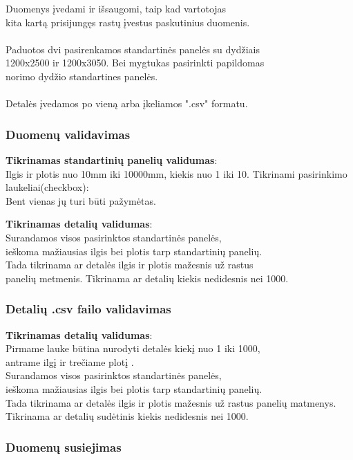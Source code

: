 \documentclass[a4paper,12pt]{article}
\begin{document}
Duomenys įvedami ir išsaugomi, taip kad vartotojas \\
kita kartą prisijungęs rastų įvestus paskutinius duomenis.\\\\
Paduotos dvi pasirenkamos standartinės panelės su dydžiais \\
1200x2500 ir 1200x3050. Bei mygtukas pasirinkti papildomas\\
norimo dydžio standartines panelės. \\\\
Detalės įvedamos po vieną arba įkeliamos ".csv" formatu. 

\subsubsection{Duomenų validavimas}
\textbf{Tikrinamas standartinių panelių validumas}:\\
	Ilgis ir plotis nuo 10mm iki 10000mm, kiekis nuo 1 iki 10.
Tikrinami pasirinkimo laukeliai(checkbox): \\
Bent vienas jų turi būti pažymėtas.

\textbf{Tikrinamas detalių validumas}:\\
Surandamos visos pasirinktos standartinės panelės, \\
ieškoma mažiausias ilgis bei plotis tarp standartinių panelių.\\
Tada tikrinama ar detalės ilgis ir plotis mažesnis už rastus \\
panelių metmenis.
Tikrinama ar detalių kiekis nedidesnis nei 1000.

\subsubsection{Detalių .csv failo validavimas}
\textbf{Tikrinamas detalių validumas}:\\
Pirmame lauke būtina nurodyti detalės kiekį nuo 1 iki 1000, \\
antrame ilgį ir trečiame plotį .\\

Surandamos visos pasirinktos standartinės panelės, \\
ieškoma mažiausias ilgis bei plotis tarp standartinių panelių.\\
Tada tikrinama ar detalės ilgis ir plotis mažesnis už rastus
panelių matmenys. \\
Tikrinama ar detalių sudėtinis kiekis nedidesnis nei 1000.


\subsubsection{Duomenų susiejimas}
\end{document}
